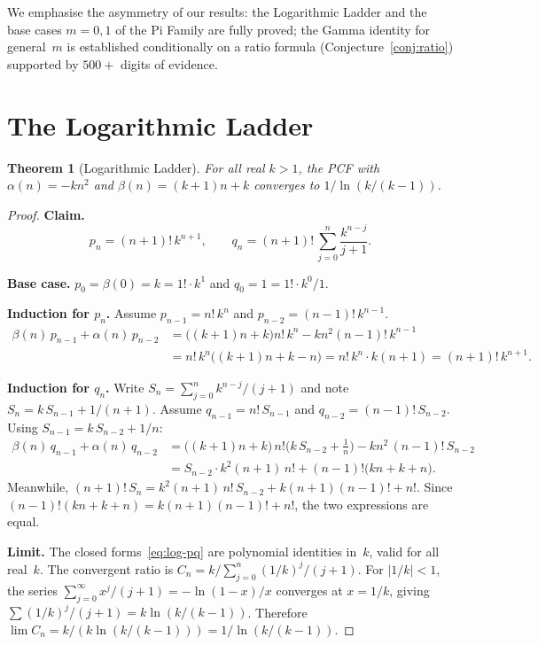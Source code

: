 \documentclass[11pt,a4paper]{article}
\theoremstyle{plain}
\newtheorem{theorem}{Theorem}[section]
\theoremstyle{definition}
\theoremstyle{remark}
\begin{document}
We emphasise the asymmetry of our results: the Logarithmic Ladder and the
base cases $m = 0, 1$ of the Pi Family are fully proved; the Gamma identity
for general~$m$ is established conditionally on a ratio formula
(Conjecture~\ref{conj:ratio}) supported by $500{+}$ digits of evidence.

\section{The Logarithmic Ladder}\label{sec:log}

\begin{theorem}[Logarithmic Ladder]\label{thm:log}
For all real $k > 1$, the PCF with
$\alpha(n) = -kn^2$ and $\beta(n) = (k{+}1)n + k$
converges to $1/\ln(k/(k{-}1))$.
\end{theorem}

\begin{proof}
\textbf{Claim.}
\begin{equation}\label{eq:log-pq}
  p_n = (n{+}1)!\, k^{n+1}, \qquad
  q_n = (n{+}1)!\, \sum_{j=0}^{n} \frac{k^{n-j}}{j+1}.
\end{equation}

\textbf{Base case.}
$p_0 = \beta(0) = k = 1!\cdot k^1$ and $q_0 = 1 = 1!\cdot k^0/1$.

\medskip\noindent\textbf{Induction for $p_n$.}
Assume $p_{n-1} = n!\,k^n$ and $p_{n-2} = (n{-}1)!\,k^{n-1}$.
\begin{align*}
  \beta(n)\,p_{n-1} + \alpha(n)\,p_{n-2}
  &= \bigl((k{+}1)n + k\bigr) n!\,k^n - kn^2 (n{-}1)!\,k^{n-1} \\
  &= n!\,k^n\bigl((k{+}1)n + k - n\bigr)
   = n!\,k^n \cdot k(n{+}1) = (n{+}1)!\,k^{n+1}.
\end{align*}

\medskip\noindent\textbf{Induction for $q_n$.}
Write $S_n = \sum_{j=0}^{n} k^{n-j}/(j{+}1)$
and note $S_n = k\,S_{n-1} + 1/(n{+}1)$.
Assume $q_{n-1} = n!\,S_{n-1}$ and $q_{n-2} = (n{-}1)!\,S_{n-2}$.
Using $S_{n-1} = k\,S_{n-2} + 1/n$:
\begin{align*}
\beta(n)\,q_{n-1} + \alpha(n)\,q_{n-2}
&= \bigl((k{+}1)n{+}k\bigr)\,n!\bigl(k\,S_{n-2}+\tfrac{1}{n}\bigr)
   - kn^2\,(n{-}1)!\,S_{n-2} \\
&= S_{n-2}\cdot k^2(n{+}1)\,n!
   + (n{-}1)!\bigl(kn+k+n\bigr).
\end{align*}
Meanwhile,
$(n{+}1)!\,S_n
= k^2(n{+}1)\,n!\,S_{n-2} + k(n{+}1)(n{-}1)! + n!$.
Since $(n{-}1)!(kn{+}k{+}n) = k(n{+}1)(n{-}1)! + n!$,
the two expressions are equal.

\medskip\noindent\textbf{Limit.}
The closed forms~\eqref{eq:log-pq} are polynomial identities in~$k$,
valid for all real~$k$.
The convergent ratio is
$C_n = k/\sum_{j=0}^{n}(1/k)^j/(j{+}1)$.
For $|1/k| < 1$, the series
$\sum_{j=0}^{\infty} x^j/(j{+}1) = -\ln(1{-}x)/x$
converges at $x = 1/k$, giving
$\sum (1/k)^j/(j{+}1) = k\ln(k/(k{-}1))$.
Therefore
$\lim C_n = k/(k\ln(k/(k{-}1))) = 1/\ln(k/(k{-}1))$.
\end{proof}
\end{document}
